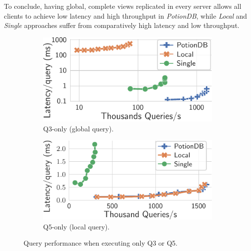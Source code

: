 \documentclass[sigplan,twocolumn,review,anonymous]{acmart}
\begin{document}
To conclude, having global, complete views replicated in every server allows all clients to achieve low latency and high throughput in \textit{PotionDB}, while \textit{Local} and \textit{Single} approaches suffer from comparatively high latency and low throughput.



\begin{figure}
	\centering
	\begin{subfigure}{.49\linewidth}
		\includegraphics[width=1\linewidth]{singleQuery/q3_latency}
	\vspace*{-10pt}
			\caption{Q3-only (global query).}
		\label{fig:q3_tc}
	\end{subfigure}%
	\hspace*{0.2em}
	\begin{subfigure}{.49\linewidth}
		\includegraphics[width=1\linewidth]{singleQuery/q5_latency}
	\vspace*{-10pt}
		\caption{Q5-only (local query).}
		\label{fig:q5_tc}
	\end{subfigure}%
	\vspace*{-10pt}
	\caption{Query performance when executing only Q3 or Q5.}
	\label{fig:q3_q5_tc}
	\vspace*{-10pt}
\end{figure}
\end{document}
